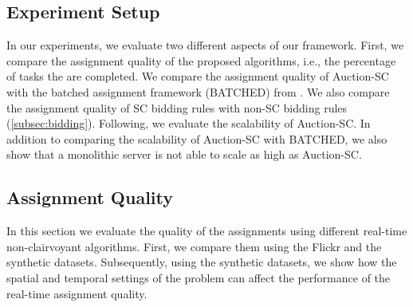 

\subsection{Experiment Setup}
\label{subsec:exp_setup}

In our experiments, we evaluate two different aspects of our framework. First, we compare the assignment quality of the proposed algorithms, i.e., the percentage of tasks the are completed. We compare the assignment quality of Auction-SC with the batched assignment framework (BATCHED) from \cite{Deng15}. We also compare the assignment quality of SC bidding rules with non-SC bidding rules (\cref{subsec:bidding}). Following, we evaluate the scalability of Auction-SC. In addition to comparing the scalability of Auction-SC with BATCHED, we also show that a monolithic server is not able to scale as high as Auction-SC.




\subsection{Assignment Quality}
In this section we evaluate the quality of the assignments using different real-time non-clairvoyant algorithms. First, we compare them using the Flickr and the synthetic datasets. Subsequently, using the synthetic datasets, we show how the spatial and temporal settings of the problem can affect the performance of the real-time assignment quality.

